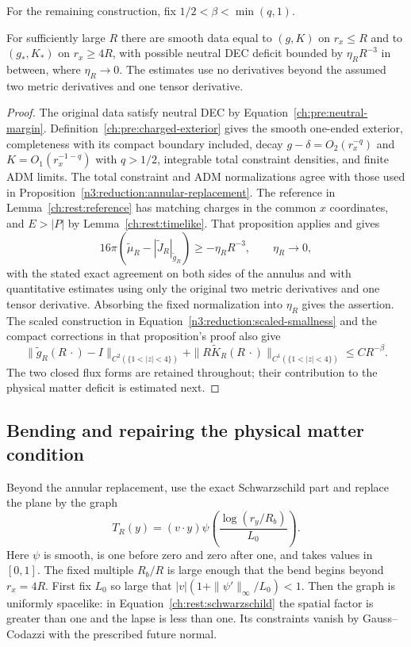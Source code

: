 For the remaining construction, fix $1/2<\beta<\min(q,1)$.

\begin{lemma}
\label{ch:rest:annular}
For sufficiently large $R$ there are smooth data equal to $(g,K)$ on
$r_x\le R$ and to $(g_*,K_*)$ on $r_x\ge4R$, with possible neutral
DEC deficit bounded by $\eta_R R^{-3}$ in between, where
$\eta_R\to0$. The estimates use no derivatives beyond the assumed
two metric derivatives and one tensor derivative.
\end{lemma}
\begin{proof}
The original data satisfy neutral DEC by
Equation~\eqref{ch:pre:neutral-margin}. Definition~\ref{ch:pre:charged-exterior}
gives the smooth one-ended exterior, completeness with its compact
boundary included, decay $g-\delta=O_2(r_x^{-q})$ and
$K=O_1(r_x^{-1-q})$ with $q>1/2$, integrable total constraint
densities, and finite ADM limits. The total constraint and ADM
normalizations agree with those used in
Proposition~\ref{n3:reduction:annular-replacement}.
The reference in Lemma~\ref{ch:rest:reference} has matching charges
in the common $x$ coordinates, and $E>|P|$ by
Lemma~\ref{ch:rest:timelike}. That proposition applies and gives
\[
 16\pi(\widetilde\mu_R-
       |\widetilde J_R|_{\widetilde g_R})
 \ge -\eta_RR^{-3},\qquad \eta_R\longrightarrow0,
\]
with the stated exact agreement on both sides of the annulus and
with quantitative estimates using only the original two metric
derivatives and one tensor derivative. Absorbing the fixed
normalization into $\eta_R$ gives the assertion.
The scaled construction in Equation~\eqref{n3:reduction:scaled-smallness}
and the compact corrections in that proposition's proof also give
\[
 \|\widetilde g_R(R\,\cdot)-I\|_{C^2(\{1<|z|<4\})}
 +\|R\widetilde K_R(R\,\cdot)\|_{C^1(\{1<|z|<4\})}
 \le C R^{-\beta}.
\]
The two closed flux forms are retained throughout; their contribution
to the physical matter deficit is estimated next.
\end{proof}

\subsection{Bending and repairing the physical matter condition}

Beyond the annular replacement, use the exact Schwarzschild part and
replace the plane by the graph
\begin{equation}
 \label{ch:rest:bend}
 T_R(y)=(v\cdot y)\psi\left(\frac{\log(r_y/R_b)}{L_0}\right).
\end{equation}
Here $\psi$ is smooth, is one before zero and zero after one, and takes
values in $[0,1]$. The fixed multiple $R_b/R$ is large enough that the
bend begins beyond $r_x=4R$. First fix $L_0$ so large that
$|v|(1+\|\psi'\|_\infty/L_0)<1$. Then the graph is uniformly
spacelike: in Equation~\eqref{ch:rest:schwarzschild} the spatial factor
is greater than one and the lapse is less than one. Its constraints
vanish by Gauss--Codazzi with the prescribed future normal.

